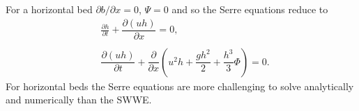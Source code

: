 For a horizontal bed $\partial b / \partial x = 0$, $\Psi = 0$ and so the Serre equations reduce to
\begin{subequations}
	\label{eqn:FullSerreNonConHorizbed}
	\begin{align}
	\label{eqn:FullSerreNonConMassHorizbed}
	&\frac{\partial h}{\partial t} + \dfrac{\partial (uh)}{\partial x} = 0, \\ \nonumber \\
	\label{eqn:FullSerreNonConMomeHorizbed}
	&\dfrac{\partial (uh)}{\partial t} + \dfrac{\partial}{\partial x} \left ( u^2h + \dfrac{gh^2}{2} + \dfrac{h^3}{3}{ \Phi }  \right ) = 0.
	\end{align}
\end{subequations}	
For horizontal beds the Serre equations are more challenging to solve analytically and numerically than the SWWE. 

